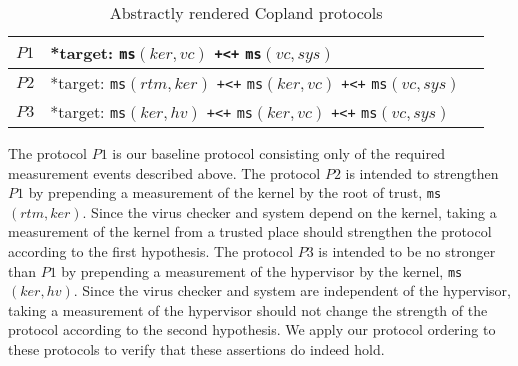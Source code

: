 \documentclass[runningheads]{llncs}
\theoremstyle{definition}
\begin{document}
\begin{table}[h]
  \setlength\extrarowheight{7pt}
  \centering
  \footnotesize
  \begin{tabular}{|M{1cm}|M{8cm}|N}
      \hline  
      $P1$ & *target:  \texttt{ms}$(ker, vc)$ \texttt{+<+} \texttt{ms}$(vc, sys)$ &\\ \hline 
      $P2$ & *target: \texttt{ms}$(rtm, ker)$ \texttt{+<+} \texttt{ms}$(ker, vc)$ \texttt{+<+} \texttt{ms}$(vc, sys)$ &\\
      \hline
      $P3$ & *target: \texttt{ms}$(ker, hv)$ \texttt{+<+} \texttt{ms}$(ker, vc)$ \texttt{+<+} \texttt{ms}$(vc, sys)$ &\\ \hline 
  \end{tabular}
  \caption[Chase Analysis with Varied Dependencies]{Abstractly rendered Copland protocols}
  \label{Chase-table}
\end{table}

The protocol $P1$ is our baseline protocol consisting only of
the required measurement events described above. The protocol
$P2$ is intended to strengthen $P1$ by prepending a measurement
of the kernel by the root of trust, \texttt{ms}$(rtm,ker)$. Since the virus checker and
system depend on the kernel, taking a measurement of the kernel from a
trusted place should strengthen the protocol according to the first hypothesis. 
The protocol $P3$ is intended to be no stronger than $P1$ by prepending 
a measurement of the hypervisor by the kernel,
\texttt{ms}$(ker,hv)$. Since the virus checker and system are
independent of the hypervisor, taking a measurement of the hypervisor
should not change the strength of the protocol according to the second hypothesis. 
We apply our protocol ordering to these protocols to verify that
these assertions do indeed hold.
\end{document}
